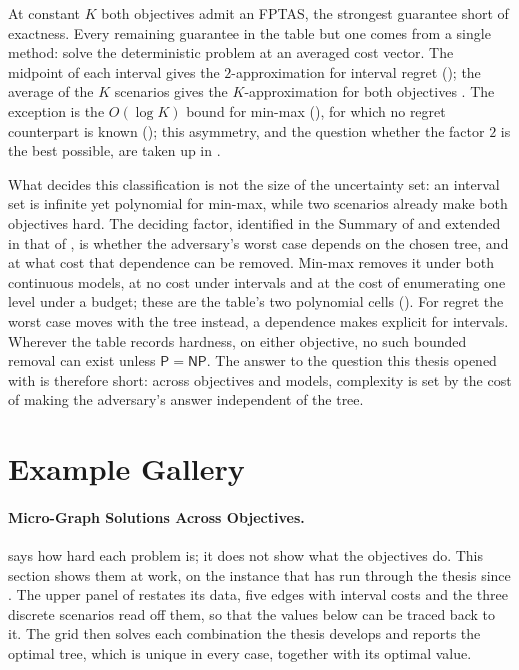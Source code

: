 At constant $K$ both objectives admit an FPTAS, the strongest guarantee short of exactness.
Every remaining guarantee in the table but one comes from a single method: solve the deterministic problem at an averaged cost vector.
The midpoint of each interval gives the $2$-approximation for interval regret (); the average of the $K$ scenarios gives the $K$-approximation for both objectives \cite[Theorem~5.4]{Goerigk2021RCO}.
The exception is the $O(\log K)$ bound for min-max (), for which no regret counterpart is known (); this asymmetry, and the question whether the factor $2$ is the best possible, are taken up in .

What decides this classification is not the size of the uncertainty set: an interval set is infinite yet polynomial for min-max, while two scenarios already make both objectives hard.
The deciding factor, identified in the Summary of  and extended in that of , is whether the adversary's worst case depends on the chosen tree, and at what cost that dependence can be removed.
Min-max removes it under both continuous models, at no cost under intervals and at the cost of enumerating one level under a budget; these are the table's two polynomial cells ().
For regret the worst case moves with the tree instead, a dependence  makes explicit for intervals.
Wherever the table records hardness, on either objective, no such bounded removal can exist unless $\mathsf{P} = \mathsf{NP}$.
The answer to the question this thesis opened with is therefore short: across objectives and models, complexity is set by the cost of making the adversary's answer independent of the tree.

\section{Example Gallery}\label{sec:gallery}

\paragraph{Micro-Graph Solutions Across Objectives.}

 says how hard each problem is; it does not show what the objectives do.
This section shows them at work, on the instance that has run through the thesis since .
The upper panel of  restates its data, five edges with interval costs and the three discrete scenarios read off them, so that the values below can be traced back to it.
The grid then solves each combination the thesis develops and reports the optimal tree, which is unique in every case, together with its optimal value.

